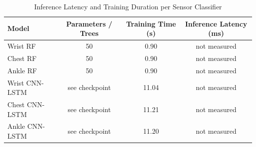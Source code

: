 \begin{table}[htbp]
\caption{Inference Latency and Training Duration per Sensor Classifier}
\label{tab:model_latency}
\centering
\begin{tabular}{lccc}
\hline
Model & Parameters / Trees & Training Time (s) & Inference Latency (ms) \\ \hline
Wrist RF & 50 & 0.90 & not measured \\
Chest RF & 50 & 0.90 & not measured \\
Ankle RF & 50 & 0.90 & not measured \\
Wrist CNN-LSTM & see checkpoint & 11.04 & not measured \\
Chest CNN-LSTM & see checkpoint & 11.21 & not measured \\
Ankle CNN-LSTM & see checkpoint & 11.20 & not measured \\
\hline
\end{tabular}
\end{table}
